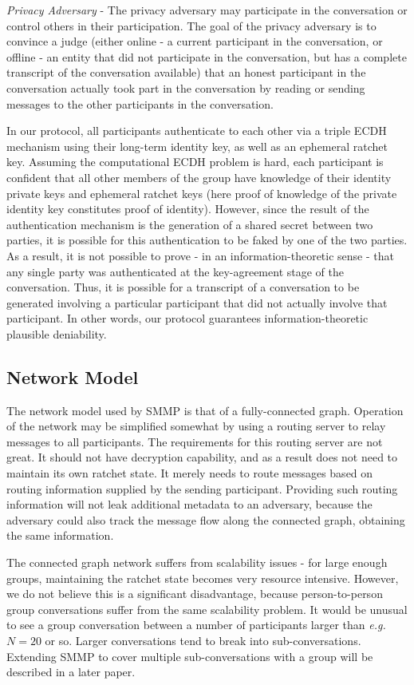 \documentclass[%
preprint,
amsmath,amssymb,
aps,
prb,
floatfix,
]{revtex4-1}
\begin{document}
\textit{Privacy Adversary} - The privacy adversary may participate in the
conversation or control others in their participation. The goal of the privacy
adversary is to convince a judge (either online - a current participant in the
conversation, or offline - an entity that did not participate in the
conversation, but has a complete transcript of the conversation available)
that an honest participant in the conversation actually took part in the
conversation by reading or sending messages to the other participants in the
conversation.

In our protocol, all participants authenticate to each other via a triple ECDH
mechanism\cite{ref:tripledh}
using their long-term identity key, as well as an ephemeral ratchet
key.
Assuming the computational ECDH problem is hard, each participant is
confident that all other members of the group have knowledge of their identity
private keys and ephemeral ratchet keys (here proof of knowledge of the private
identity key constitutes proof of identity). However, since the result of the
authentication mechanism is the generation of a shared secret between two
parties, it is possible for this authentication to be faked by one of the two
parties. As a result, it is not possible to prove - in an information-theoretic
sense - that any single party was authenticated at the key-agreement stage of
the conversation. Thus,
it is possible for a transcript of a conversation to be generated
involving a particular participant that did not actually involve that
participant. In other words, 
our protocol guarantees information-theoretic plausible deniability.

\subsection{\label{sec:networkmodel}Network Model}
The network model used by SMMP is that of a fully-connected graph.
Operation of the network may be simplified somewhat by using a routing server to
relay messages to all participants. The requirements for this routing server are
not great. It should not have decryption capability, and as a result does not
need to maintain its own ratchet state. It merely needs to route messages based
on routing information supplied by the sending participant. Providing such routing
information will not leak additional metadata to an adversary, because the
adversary could also track the message flow along the connected graph, obtaining
the same information.

The connected graph network suffers from scalability issues - for large enough
groups, maintaining the ratchet state becomes very resource intensive. However,
we do not believe this is a significant disadvantage, because person-to-person
group conversations suffer from the same scalability problem. It  would be
unusual to see a group conversation between a number of participants larger
than \textit{e.g.} $N = 20$ or so. Larger conversations tend to break into
sub-conversations.
Extending SMMP to cover multiple sub-conversations with a group will be
described in a later paper.
\end{document}
